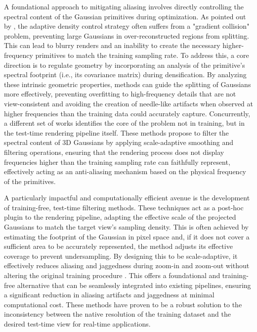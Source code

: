 \documentclass[11pt,a4paper]{article}
\begin{document}
A foundational approach to mitigating aliasing involves directly controlling the spectral content of the Gaussian primitives during optimization. As pointed out by \cite{arxiv:2404.10484v1}, the adaptive density control strategy often suffers from a "gradient collision" problem, preventing large Gaussians in over-reconstructed regions from splitting. This can lead to blurry renders and an inability to create the necessary higher-frequency primitives to match the training sampling rate. To address this, a core direction is to regulate geometry by incorporating an analysis of the primitive's spectral footprint (i.e., its covariance matrix) during densification. By analyzing these intrinsic geometric properties, methods can guide the splitting of Gaussians more effectively, preventing overfitting to high-frequency details that are not view-consistent and avoiding the creation of needle-like artifacts when observed at higher frequencies than the training data could accurately capture. Concurrently, a different set of works identifies the core of the problem not in training, but in the test-time rendering pipeline itself. These methods propose to filter the spectral content of 3D Gaussians by applying scale-adaptive smoothing and filtering operations, ensuring that the rendering process does not display frequencies higher than the training sampling rate can faithfully represent, effectively acting as an anti-aliasing mechanism based on the physical frequency of the primitives.

A particularly impactful and computationally efficient avenue is the development of training-free, test-time filtering methods. These techniques act as a post-hoc plugin to the rendering pipeline, adapting the effective scale of the projected Gaussians to match the target view's sampling density. This is often achieved by estimating the footprint of the Gaussian in pixel space and, if it does not cover a sufficient area to be accurately represented, the method adjusts its effective coverage to prevent undersampling. By designing this to be scale-adaptive, it effectively reduces aliasing and jaggedness during zoom-in and zoom-out without altering the original training procedure \cite{arxiv:2403.13806v1}. This offers a foundational and training-free alternative that can be seamlessly integrated into existing pipelines, ensuring a significant reduction in aliasing artifacts and jaggedness at minimal computational cost. These methods have proven to be a robust solution to the inconsistency between the native resolution of the training dataset and the desired test-time view for real-time applications.
\end{document}
